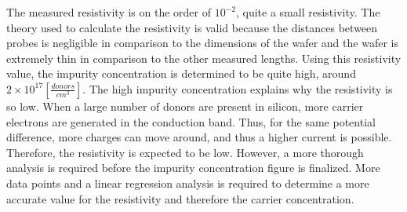 The measured resistivity is on the order of $10^{-2}$, quite a small resistivity. The theory used to calculate the resistivity is valid because the distances between probes is negligible in comparison to the dimensions of the wafer and the wafer is extremely thin in comparison to the other measured lengths. Using this resistivity value, the impurity concentration is determined to be quite high, around $2 \times 10^{17} [\frac{donors}{cm^3}]$. The high impurity concentration explains why the resistivity is so low. When a large number of donors are present in silicon, more carrier electrons are generated in the conduction band. Thus, for the same potential difference, more charges can move around, and thus a higher current is possible. Therefore, the resistivity is expected to be low. However, a more thorough analysis is required before the impurity concentration figure is finalized. More data points and a linear regression analysis is required to determine a more accurate value for the resistivity and therefore the carrier concentration.
